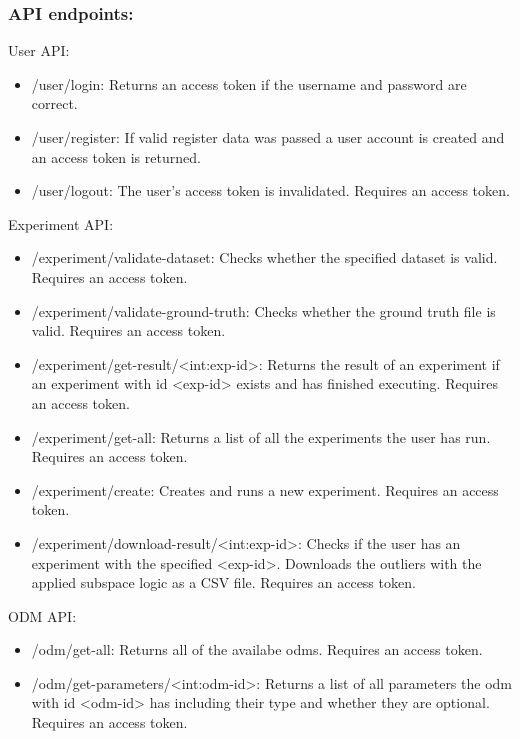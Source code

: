 \subsubsection*{API endpoints:}
User API:
\begin{itemize}
    \item /user/login: Returns an access token if the username and password are correct.
    \item /user/register: If valid register data was passed a user account is created and an access token is returned.
    \item /user/logout: The user's access token is invalidated. Requires an access token.
\end{itemize}
Experiment API:
\begin{itemize}
    \item /experiment/validate-dataset: Checks whether the specified dataset is valid. Requires an access token.
    \item /experiment/validate-ground-truth: Checks whether the ground truth file is valid. Requires an access token.
    \item /experiment/get-result/<int:exp-id>: Returns the result of an experiment if an experiment with id <exp-id> exists and has finished executing. Requires an access token.
    \item /experiment/get-all: Returns a list of all the experiments the user has run. Requires an access token.
    \item /experiment/create: Creates and runs a new experiment. Requires an access token.
    \item /experiment/download-result/<int:exp-id>: Checks if the user has an experiment with the specified <exp-id>. Downloads the outliers with the applied subspace logic as a CSV file. Requires an access token.
\end{itemize}
ODM API:
\begin{itemize}
    \item /odm/get-all: Returns all of the availabe odms. Requires an access token.
    \item /odm/get-parameters/<int:odm-id>: Returns a list of all parameters the odm with id <odm-id> has including their type and whether they are optional. Requires an access token.
\end{itemize}
